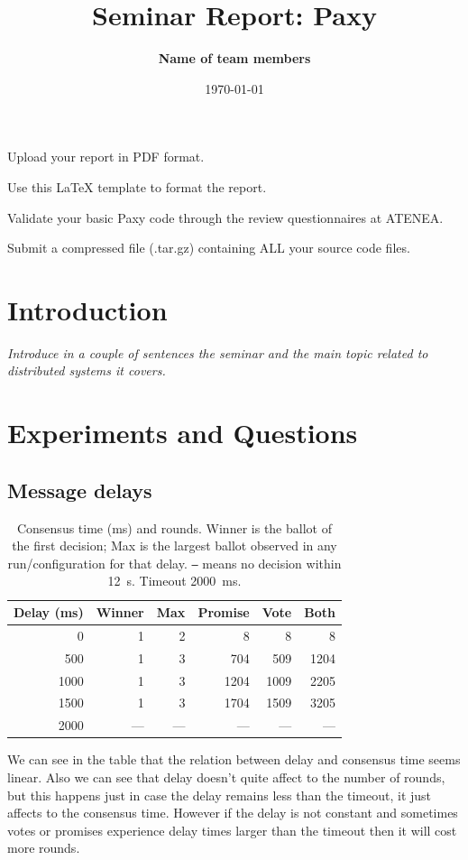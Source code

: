 \documentclass[a4paper, 10pt]{article}
\title{Seminar Report: Paxy}
\author{\textbf{Name of team members}}
\date{\normalsize\today{}}
\begin{document}
\maketitle

\begin{center}
Upload your report in PDF format.
  
Use this LaTeX template to format the report.
  
Validate your basic Paxy code through the review questionnaires at ATENEA.

Submit a compressed file (.tar.gz) containing ALL your source code files.
\end{center}

\section{Introduction}

\textit{Introduce in a couple of sentences the seminar and the main topic related to distributed systems it covers.}

\section{Experiments and Questions}

\subsection{Message delays}

\begin{table}[htbp]
\centering
\small
\begin{tabular}{r|r|r|r|r|r}
\hline
Delay (ms) & Winner & Max & Promise & Vote & Both \\
\hline
0 & 1 & 2 & 8 & 8 & 8 \\
500 & 1 & 3 & 704 & 509 & 1204 \\
1000 & 1 & 3 & 1204 & 1009 & 2205 \\
1500 & 1 & 3 & 1704 & 1509 & 3205 \\
2000 & --- & --- & --- & --- & --- \\
\hline
\end{tabular}
\caption{Consensus time (ms) and rounds. Winner is the ballot of the first
decision; Max is the largest ballot observed in any run/configuration for that
delay. \texttt{---} means no decision within 12~s. Timeout 2000~ms.}
\label{tab:delays}
\end{table}

\noindent We can see in the table that the relation between delay and consensus time seems linear. Also we can see that delay doesn't quite affect to the number of rounds, but this happens just in case the delay remains less than the timeout, it just affects to the consensus time. However if the delay is not constant and sometimes votes or promises experience delay times larger than the timeout then it will cost more rounds. \\
\end{document}
